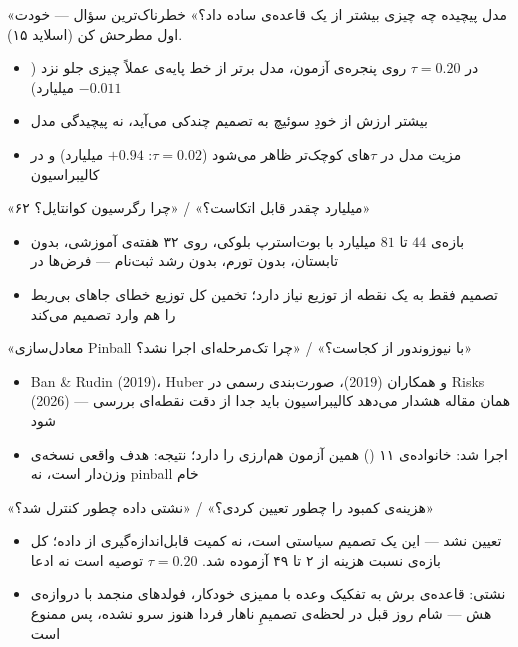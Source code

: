 
\begin{frame}{«مدل پیچیده چه چیزی بیشتر از یک قاعده‌ی ساده داد؟»}
  خطرناک‌ترین سؤال — خودت اول مطرحش کن (اسلاید ۱۵).
  \begin{itemize}
    \item در $\tau=0.20$ روی پنجره‌ی آزمون، مدل برتر از خط پایه‌ی  عملاً چیزی جلو نزد
      ($-0.011$ میلیارد)
    \item بیشتر ارزش از خودِ سوئیچ به تصمیم چندکی می‌آید، نه پیچیدگی مدل
    \item مزیت مدل در $\tau$های کوچک‌تر ظاهر می‌شود ($\tau=0.02$: $+0.94$ میلیارد) و در
      کالیبراسیون
  \end{itemize}
\end{frame}

\begin{frame}{«۶۲ میلیارد چقدر قابل اتکاست؟» / «چرا رگرسیون کوانتایل؟»}
  \begin{itemize}
    \item بازه‌ی $44$ تا $81$ میلیارد با بوت‌استرپ بلوکی، روی ۳۲ هفته‌ی آموزشی، بدون
      تابستان، بدون تورم، بدون رشد ثبت‌نام — فرض‌ها در 
    \item تصمیم فقط به یک نقطه از توزیع نیاز دارد؛ تخمین کل توزیع خطای جاهای بی‌ربط را هم
      وارد تصمیم می‌کند
  \end{itemize}
\end{frame}

\begin{frame}{«معادل‌سازی Pinball با نیوزوندور از کجاست؟» / «چرا تک‌مرحله‌ای اجرا نشد؟»}
  \begin{itemize}
    \item Ban \& Rudin (2019)، Huber و همکاران (2019)، صورت‌بندی رسمی در Risks (2026) —
      همان مقاله هشدار می‌دهد کالیبراسیون باید جدا از دقت نقطه‌ای بررسی شود
    \item اجرا شد: خانواده‌ی ۱۱ () همین آزمون هم‌ارزی را دارد؛
      نتیجه: هدف واقعی نسخه‌ی وزن‌دار است، نه pinball خام
  \end{itemize}
\end{frame}

\begin{frame}{«هزینه‌ی کمبود را چطور تعیین کردی؟» / «نشتی داده چطور کنترل شد؟»}
  \begin{itemize}
    \item تعیین نشد — این یک تصمیم سیاستی است، نه کمیت قابل‌اندازه‌گیری از داده؛ کل بازه‌ی
      نسبت هزینه از ۲ تا ۴۹ آزموده شد. $\tau=0.20$ توصیه است نه ادعا
    \item نشتی: قاعده‌ی برش به تفکیک وعده با ممیزی خودکار، فولدهای منجمد با دروازه‌ی هش —
      شام روز قبل در لحظه‌ی تصمیمِ ناهار فردا هنوز سرو نشده، پس ممنوع است
  \end{itemize}
\end{frame}

